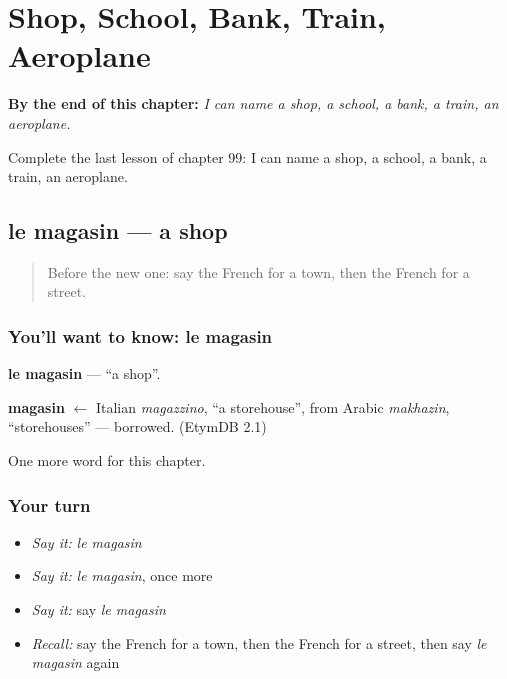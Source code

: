 
\chapter{Shop, School, Bank, Train, Aeroplane}
\label{ch:fr-shop-school-bank-train-aeroplane}

\begin{chapteropening}
\textbf{By the end of this chapter:} \emph{I can name a shop, a school, a bank, a train, an aeroplane.}

Complete the last lesson of chapter 99: I can name a shop, a school, a bank, a train, an aeroplane.
\end{chapteropening}

\section[le magasin]{le magasin — a shop}

\label{lesson:FR-C99-magasin}



\begin{quote}
Before the new one: say the French for a town, then the French for a street.
\end{quote}

\subsection*{You'll want to know: le magasin}
\textbf{le magasin} — \textquotedblleft{}a shop\textquotedblright{}.

\begin{cousinweb}
\textbf{magasin} $\leftarrow$ Italian \emph{magazzino}, \textquotedblleft{}a storehouse\textquotedblright{}, from Arabic \emph{makhazin}, \textquotedblleft{}storehouses\textquotedblright{} — borrowed. (EtymDB 2.1)
\end{cousinweb}

\begin{grammarlens}[title={What you've built}]
One more word for this chapter.
\end{grammarlens}

\subsection*{Your turn}
\begin{itemize}
\raggedright
  \item \emph{Say it:} \emph{le magasin}
  \item \emph{Say it:} \emph{le magasin}, once more
  \item \emph{Say it:} say \emph{le magasin}
  \item \emph{Recall:} say the French for a town, then the French for a street, then say \emph{le magasin} again
\end{itemize}

